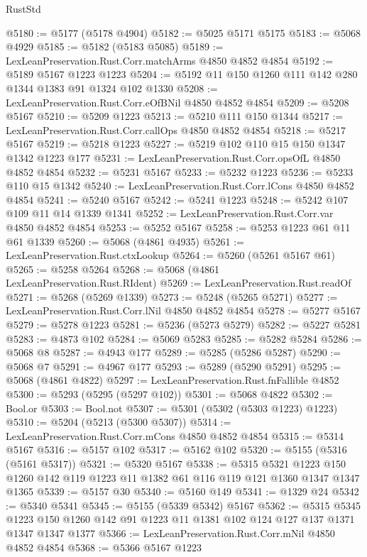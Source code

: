 \begin{lexlean}{RustStd}
\begin{coremodule}
@5180 := @5177 (@5178 @4904)
@5182 := @5025 @5171 @5175
@5183 := @5068 @4929
@5185 := @5182 (@5183 @5085)
@5189 := LexLeanPreservation.Rust.Corr.matchArms @4850 @4852 @4854
@5192 := @5189 @5167 @1223 @1223
@5204 := @5192 @11 @150 @1260 @111 @142 @280 @1344 @1383 @91 @1324 @102 @1330
@5208 := LexLeanPreservation.Rust.Corr.eOfBNil @4850 @4852 @4854
@5209 := @5208 @5167
@5210 := @5209 @1223
@5213 := @5210 @111 @150 @1344
@5217 := LexLeanPreservation.Rust.Corr.callOps @4850 @4852 @4854
@5218 := @5217 @5167
@5219 := @5218 @1223
@5227 := @5219 @102 @110 @15 @150 @1347 @1342 @1223 @177
@5231 := LexLeanPreservation.Rust.Corr.opsOfL @4850 @4852 @4854
@5232 := @5231 @5167
@5233 := @5232 @1223
@5236 := @5233 @110 @15 @1342
@5240 := LexLeanPreservation.Rust.Corr.lCons @4850 @4852 @4854
@5241 := @5240 @5167
@5242 := @5241 @1223
@5248 := @5242 @107 @109 @11 @14 @1339 @1341
@5252 := LexLeanPreservation.Rust.Corr.var @4850 @4852 @4854
@5253 := @5252 @5167
@5258 := @5253 @1223 @61 @11 @61 @1339
@5260 := @5068 (@4861 @4935)
@5261 := LexLeanPreservation.Rust.ctxLookup
@5264 := @5260 (@5261 @5167 @61)
@5265 := @5258 @5264
@5268 := @5068 (@4861 LexLeanPreservation.Rust.RIdent)
@5269 := LexLeanPreservation.Rust.readOf
@5271 := @5268 (@5269 @1339)
@5273 := @5248 (@5265 @5271)
@5277 := LexLeanPreservation.Rust.Corr.lNil @4850 @4852 @4854
@5278 := @5277 @5167
@5279 := @5278 @1223
@5281 := @5236 (@5273 @5279)
@5282 := @5227 @5281
@5283 := @4873 @102
@5284 := @5069 @5283
@5285 := @5282 @5284
@5286 := @5068 @8
@5287 := @4943 @177
@5289 := @5285 (@5286 @5287)
@5290 := @5068 @7
@5291 := @4967 @177
@5293 := @5289 (@5290 @5291)
@5295 := @5068 (@4861 @4822)
@5297 := LexLeanPreservation.Rust.fnFallible @4852
@5300 := @5293 (@5295 (@5297 @102))
@5301 := @5068 @4822
@5302 := Bool.or
@5303 := Bool.not
@5307 := @5301 (@5302 (@5303 @1223) @1223)
@5310 := @5204 (@5213 (@5300 @5307))
@5314 := LexLeanPreservation.Rust.Corr.mCons @4850 @4852 @4854
@5315 := @5314 @5167
@5316 := @5157 @102
@5317 := @5162 @102
@5320 := @5155 (@5316 (@5161 @5317))
@5321 := @5320 @5167
@5338 := @5315
    @5321
    @1223
    @150
    @1260
    @142
    @119
    @1223
    @11
    @1382
    @61
    @116
    @119
    @121
    @1360
    @1347
    @1347
    @1365
@5339 := @5157 @30
@5340 := @5160 @149
@5341 := @1329 @24
@5342 := @5340 @5341
@5345 := @5155 (@5339 @5342) @5167
@5362 := @5315
    @5345
    @1223
    @150
    @1260
    @142
    @91
    @1223
    @11
    @1381
    @102
    @124
    @127
    @137
    @1371
    @1347
    @1347
    @1377
@5366 := LexLeanPreservation.Rust.Corr.mNil @4850 @4852 @4854
@5368 := @5366 @5167 @1223

\end{coremodule}
\end{lexlean}
